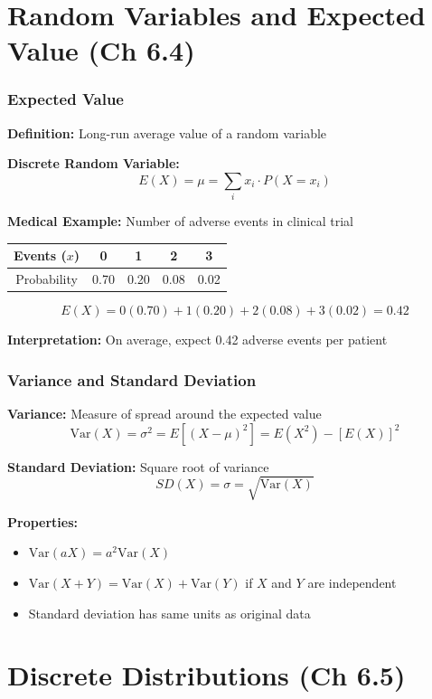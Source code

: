 \documentclass{beamer}
\begin{document}
\section{Random Variables and Expected Value (Ch 6.4)}

\begin{frame}
\frametitle{Expected Value}
\textbf{Definition:} Long-run average value of a random variable

\vspace{0.5cm}
\textbf{Discrete Random Variable:}
$$E(X) = \mu = \sum_{i} x_i \cdot P(X = x_i)$$

\vspace{0.5cm}
\textbf{Medical Example:} Number of adverse events in clinical trial
\begin{center}
\begin{tabular}{|c|c|c|c|c|}
\hline
Events ($x$) & 0 & 1 & 2 & 3 \\
\hline
Probability & 0.70 & 0.20 & 0.08 & 0.02 \\
\hline
\end{tabular}
\end{center}

$$E(X) = 0(0.70) + 1(0.20) + 2(0.08) + 3(0.02) = 0.42$$

\textbf{Interpretation:} On average, expect 0.42 adverse events per patient
\end{frame}

\begin{frame}
\frametitle{Variance and Standard Deviation}
\textbf{Variance:} Measure of spread around the expected value
$$\text{Var}(X) = \sigma^2 = E[(X - \mu)^2] = E(X^2) - [E(X)]^2$$

\textbf{Standard Deviation:} Square root of variance
$$SD(X) = \sigma = \sqrt{\text{Var}(X)}$$

\vspace{0.5cm}
\textbf{Properties:}
\begin{itemize}
\item $\text{Var}(aX) = a^2 \text{Var}(X)$
\item $\text{Var}(X + Y) = \text{Var}(X) + \text{Var}(Y)$ if $X$ and $Y$ are independent
\item Standard deviation has same units as original data
\end{itemize}
\end{frame}

\section{Discrete Distributions (Ch 6.5)}
\end{document}
